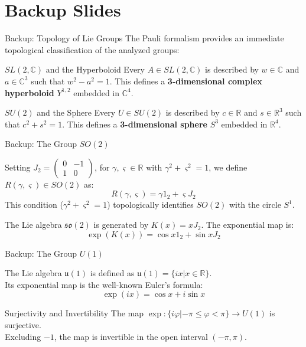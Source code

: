 \appendix
\section*{Backup Slides}

\begin{frame}{Backup: Topology of Lie Groups}
    The Pauli formalism provides an immediate topological classification of the analyzed groups:
    \vspace{0.3cm}
    \begin{block}{$SL(2,\mathbb{C})$ and the Hyperboloid}
        Every $A \in SL(2,\mathbb{C})$ is described by $w \in \mathbb{C}$ and $a \in \mathbb{C}^3$ such that $w^2 - a^2 = 1$. This defines a \textbf{3-dimensional complex hyperboloid} $Y^{1,2}$ embedded in $\mathbb{C}^4$.
    \end{block}

    \begin{block}{$SU(2)$ and the Sphere}
        Every $U \in SU(2)$ is described by $c \in \mathbb{R}$ and $s \in \mathbb{R}^3$ such that $c^2 + s^2 = 1$. This defines a \textbf{3-dimensional sphere} $S^3$ embedded in $\mathbb{R}^4$.
    \end{block}
\end{frame}

\begin{frame}{Backup: The Group $SO(2)$}
    \begin{definition}[10.3.1]
        Setting $J_2 = \begin{pmatrix} 0 & -1 \\ 1 & 0 \end{pmatrix}$, for $\gamma, \varsigma \in \mathbb{R}$ with $\gamma^2 + \varsigma^2 = 1$, we define $R(\gamma,\varsigma) \in SO(2)$ as:
        \[ R(\gamma,\varsigma) = \gamma 1_2 + \varsigma J_2 \]
        This condition ($\gamma^2 + \varsigma^2 = 1$) topologically identifies $SO(2)$ with the circle $S^1$.
    \end{definition}

    \begin{proposition}[10.3.5]
        The Lie algebra $\mathfrak{so}(2)$ is generated by $K(x) = xJ_2$. The exponential map is:
        \[ \exp(K(x)) = \cos x 1_2 + \sin x J_2 \]
    \end{proposition}
\end{frame}

\begin{frame}{Backup: The Group $U(1)$}
    \begin{proposition}[10.4.1 \& 10.4.2]
        The Lie algebra $\mathfrak{u}(1)$ is defined as $\mathfrak{u}(1) = \{ix | x \in \mathbb{R}\}$.\\
        Its exponential map is the well-known Euler's formula:
        \[ \exp(ix) = \cos x + i \sin x \]
    \end{proposition}
    \begin{block}{Surjectivity and Invertibility}
        The map $\exp : \{ i\varphi | -\pi \leq \varphi < \pi \} \rightarrow U(1)$ is surjective.\\
        Excluding $-1$, the map is invertible in the open interval $(-\pi, \pi)$.
    \end{block}
\end{frame}